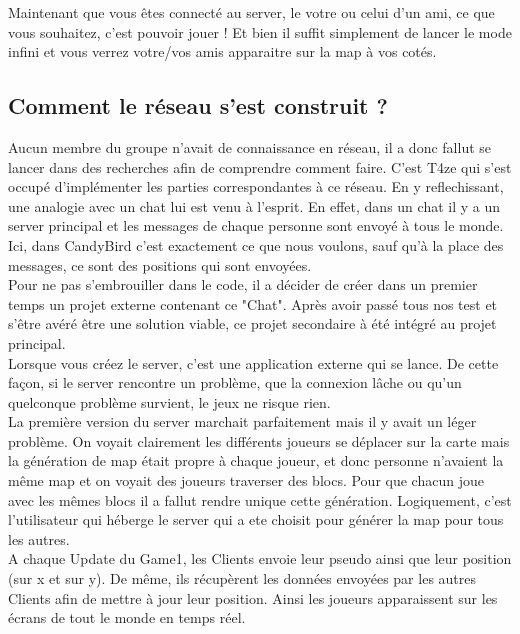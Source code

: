 \documentclass [11pt]{report}
\begin{document}
		Maintenant que vous êtes connecté au server, le votre ou celui d'un ami, ce que vous souhaitez,  c'est pouvoir jouer ! Et bien il suffit simplement de lancer le mode infini et vous verrez votre/vos amis apparaitre sur la map à vos cotés.\\		
			
			
				
		\newpage
		
		
		\subsection{Comment le réseau s'est construit ?}
		\vspace{6mm}
		
		Aucun membre du groupe n'avait de connaissance en réseau, il a donc fallut se lancer dans des recherches afin de comprendre comment faire. C'est T4ze qui s'est occupé d'implémenter les parties correspondantes à ce réseau. En y reflechissant, une analogie avec un chat lui est venu à l'esprit. En effet, dans un chat il y a un server principal et les messages de chaque personne sont envoyé à tous le monde. Ici, dans CandyBird c'est exactement ce que nous voulons, sauf qu'à la place des messages, ce sont des positions qui sont envoyées.\\
		
		Pour ne pas s'embrouiller dans le code, il a décider de créer dans un premier temps un projet externe contenant ce "Chat". Après avoir passé tous nos test et s'être avéré être une solution viable, ce projet secondaire à été intégré au projet principal.\\
		
		Lorsque vous créez le server, c'est une application externe qui se lance. De cette façon, si le server rencontre un problème, que la connexion lâche ou qu'un quelconque problème survient, le jeux ne risque rien. \\
				
		La première version du server marchait parfaitement mais il y avait un léger problème. On voyait clairement les différents joueurs se déplacer sur la carte mais la génération de map était propre à chaque joueur, et donc personne n'avaient la même map et on voyait des joueurs traverser des blocs. Pour que chacun joue avec les mêmes blocs il a fallut rendre unique cette génération. Logiquement, c'est l'utilisateur qui héberge le server qui a ete choisit pour générer la map pour tous les autres.\\
				
		A chaque Update du Game1, les Clients envoie leur pseudo ainsi que leur position (sur x et sur y). De même, ils récupèrent les données envoyées par les autres Clients afin de mettre à jour leur position. Ainsi les joueurs apparaissent sur les écrans de tout le monde en temps réel.
		
\end{document}
